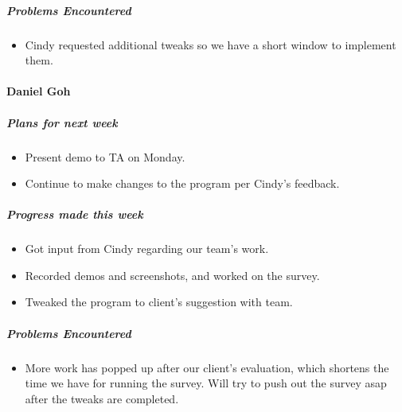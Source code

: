 {\subparagraph{Problems Encountered}
\begin{itemize}
  \item Cindy requested additional tweaks so we have a short window to implement them.
\end{itemize}

\vspace{3mm}
\paragraph{Daniel Goh}
\subparagraph{Plans for next week}
\begin{itemize}
  \item Present demo to TA on Monday.
  \item Continue to make changes to the program per Cindy's feedback.
\end{itemize}

\subparagraph{Progress made this week}
\begin{itemize}
  \item Got input from Cindy regarding our team's work.
  \item Recorded demos and screenshots, and worked on the survey.
  \item Tweaked the program to client's suggestion with team.
\end{itemize}

\subparagraph{Problems Encountered}
\begin{itemize}
  \item More work has popped up after our client's evaluation, which shortens the time we have for running the survey. Will try to push out the survey asap after the tweaks are completed.
\end{itemize}

}

\newpage

